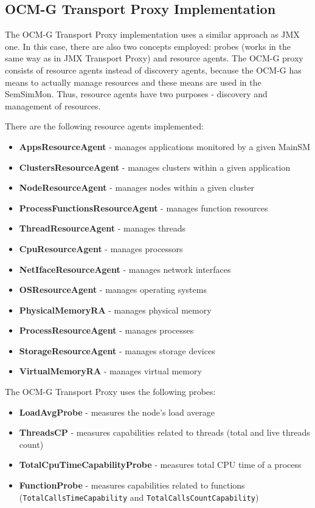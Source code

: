 \subsection{OCM-G Transport Proxy Implementation}

The OCM-G Transport Proxy implementation uses a similar approach as JMX one. In this case, there are also two concepts employed: probes (works in the same way as in JMX Transport Proxy) and resource agents. The OCM-G proxy consists of resource agents instead of discovery agents, because the OCM-G has means to actually manage resources and these means are used in the SemSimMon. Thus, resource agents have two purposes - discovery and management of resources.

There are the following resource agents implemented:

\begin{itemize} 
  \item{\bf{AppsResourceAgent}} - manages applications monitored by a given MainSM
  \item{\bf{ClustersResourceAgent}} - manages clusters within a given application
  \item{\bf{NodeResourceAgent}} - manages nodes within a given cluster
  \item{\bf{ProcessFunctionsResourceAgent}} - manages function resources
  \item{\bf{ThreadResourceAgent}} - manages threads
  \item{\bf{CpuResourceAgent}} - manages processors
  \item{\bf{NetIfaceResourceAgent}} - manages network interfaces
  \item{\bf{OSResourceAgent}} - manages operating systems
  \item{\bf{PhysicalMemoryRA}} - manages physical memory
  \item{\bf{ProcessResourceAgent}} - manages processes
  \item{\bf{StorageResourceAgent}} - manages storage devices
  \item{\bf{VirtualMemoryRA}} - manages virtual memory
 \end{itemize} 
  
The OCM-G Transport Proxy uses the following probes:

\begin{itemize} 
  \item{\bf{LoadAvgProbe}} - measures the node\rq{}s load average 
  \item{\bf{ThreadsCP}} - measures capabilities related to threads (total and live threads count)
  \item{\bf{TotalCpuTimeCapabilityProbe}} - measures total CPU time of a process
  \item{\bf{FunctionProbe}} - measures capabilities related to functions (\texttt{TotalCallsTimeCapability} and \texttt{TotalCallsCountCapability})
\end{itemize} 

